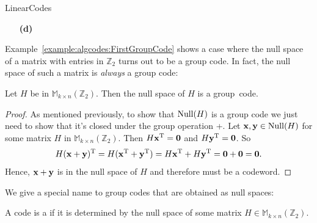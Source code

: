 \begin{exercise}{LinearCodes}
\begin{minipage}[t]{4.6in}
\begin{minipage}[t]{2.25in}
\begin{itemize}
\end{itemize}
\end{minipage} \hfill
\begin{minipage}[t]{2.25in}
\begin{itemize}
 
 \item[{\bf (d)}]
\end{itemize}
\end{minipage}
\end{minipage}




\end{exercise}
 

Example~\ref{example:algcodes:FirstGroupCode} shows a case where the null space of a matrix with entries in $\mathbb{Z}_2$ turns out to be a group code. In fact, the null space of such a matrix  is \emph{always} a group code: 
 
\begin{prop}{}
Let $H$ be in $\mathbb{M}_{k \times n}(\mathbb{Z}_2)$. Then the null space of
$H$ is a group~code.
\end{prop}
  
\begin{proof}
As mentioned previously, to show that ${\rm Null}(H)$  is a group code we just need to show that it's closed under the group operation +. Let ${\bold x},
{\bold y} \in {\rm Null}(H)$ for some matrix $H$ in $\mathbb{M}_{k \times
n}(\mathbb{Z}_2)$. Then $H{\bold x}^{\mathrm{T}} = {\bold 0}$ and $H{\bold y}^{\mathrm{T}} =
{\bold 0}$. So 
\[
H({\bold x}+{\bold y})^{\mathrm{T}} = H({\bold x}^{\mathrm{T}} +{\bold y}^{\mathrm{T}})
=
H{\bold x}^{\mathrm{T}} + H{\bold y}^{\mathrm{T}} = {\bold 0}
+
{\bold 0}
= {\bold 0}.
\]
Hence, ${\bold x}+{\bold y}$ is in the null space of $H$ and
therefore must be a codeword. 
\end{proof}

We give a special name to  group codes that are obtained as null spaces:

\begin{defn}
A code is a  if it is
determined by the null space of some matrix $H \in \mathbb{M}_{k \times
n}(\mathbb{Z}_2)$.  
 \end{defn}
 

